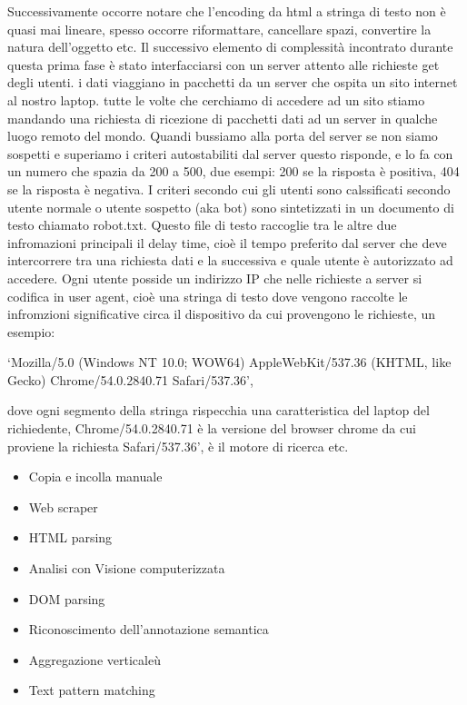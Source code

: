 \documentclass[
  12pt,
  a4paper,
]{book}
\providecommand{\tightlist}{%
  \setlength{\itemsep}{0pt}\setlength{\parskip}{0pt}}
\begin{document}
Successivamente occorre notare che l'encoding da html a stringa di testo non è quasi mai lineare, spesso occorre riformattare, cancellare spazi, convertire la natura dell'oggetto etc.
Il successivo elemento di complessità incontrato durante questa prima fase è stato interfacciarsi con un server attento alle richieste get degli utenti. i dati viaggiano in pacchetti da un server che ospita un sito internet al nostro laptop. tutte le volte che cerchiamo di accedere ad un sito stiamo mandando una richiesta di ricezione di pacchetti dati ad un server in qualche luogo remoto del mondo. Quandi bussiamo alla porta del server se non siamo sospetti e superiamo i criteri autostabiliti dal server questo risponde, e lo fa con un numero che spazia da 200 a 500, due esempi: 200 se la risposta è positiva, 404 se la risposta è negativa. I criteri secondo cui gli utenti sono calssificati secondo utente normale o utente sospetto (aka bot) sono sintetizzati in un documento di testo chiamato robot.txt. Questo file di testo raccoglie tra le altre due infromazioni principali il delay time, cioè il tempo preferito dal server che deve intercorrere tra una richiesta dati e la successiva e quale utente è autorizzato ad accedere. Ogni utente posside un indirizzo IP che nelle richieste a server si codifica in user agent, cioè una stringa di testo dove vengono raccolte le infromzioni significative circa il dispositivo da cui provengono le richieste, un esempio:

`Mozilla/5.0 (Windows NT 10.0; WOW64) AppleWebKit/537.36 (KHTML, like Gecko) Chrome/54.0.2840.71 Safari/537.36',

dove ogni segmento della stringa rispecchia una caratteristica del laptop del richiedente, Chrome/54.0.2840.71 è la versione del browser chrome da cui proviene la richiesta Safari/537.36', è il motore di ricerca etc.

\begin{itemize}
\tightlist
\item
  Copia e incolla manuale
\item
  Web scraper
\item
  HTML parsing
\item
  Analisi con Visione computerizzata
\item
  DOM parsing
\item
  Riconoscimento dell'annotazione semantica
\item
  Aggregazione verticaleù
\item
  Text pattern matching
\end{itemize}
\end{document}

